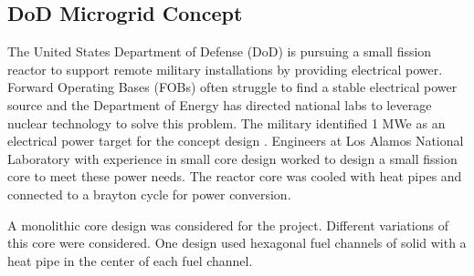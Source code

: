     \subsection{DoD Microgrid Concept}
    The United States Department of Defense (DoD) is pursuing a small fission
    reactor to support remote military installations by providing electrical
    power. Forward Operating Bases (FOBs) often struggle to find a stable
    electrical power source and the Department of Energy has directed national
    labs to leverage nuclear technology to solve this problem. The military
    identified 1 MWe as an electrical power target for the concept design
    \citep{army_reactor_slides}.
    Engineers at Los Alamos National Laboratory with experience in small core
    design worked to design a small fission core to meet these power needs. The
    reactor core was cooled with heat pipes and connected to a brayton cycle for
    power conversion.

    A monolithic core design was considered for the project. Different
    variations of this core were considered. One design used hexagonal fuel channels of
    solid \uox with a heat pipe in the center of each fuel channel. 
